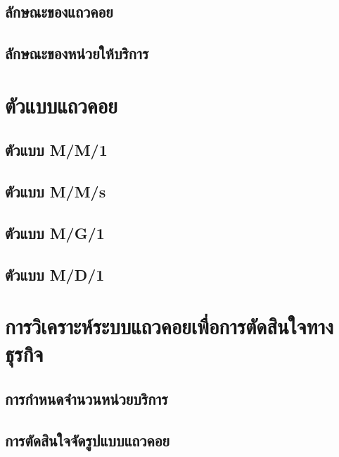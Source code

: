 \subsection{ลักษณะของแถวคอย}
\subsection{ลักษณะของหน่วยให้บริการ}


\section{ตัวแบบแถวคอย}
\subsection{ตัวแบบ M/M/1}
\subsection{ตัวแบบ M/M/s}
\subsection{ตัวแบบ M/G/1}
\subsection{ตัวแบบ M/D/1}

\section{การวิเคราะห์ระบบแถวคอยเพื่อการตัดสินใจทางธุรกิจ}
\subsection{การกำหนดจำนวนหน่วยบริการ}
\subsection{การตัดสินใจจัดรูปแบบแถวคอย}